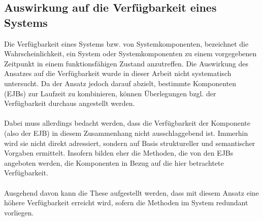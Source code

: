 \subsection{Auswirkung auf die Verfügbarkeit eines Systems}\label{sec_stabliliy}
Die Verfügbarkeit eines Systems bzw. von Systemkomponenten, bezeichnet die Wahrscheinlichkeit, ein System oder Systemkomponenten zu einem vorgegebenen Zeitpunkt in einem funktionsfähigen Zustand anzutreffen. \cite{it-admin}
Die Auswirkung des Ansatzes auf die Verfügbarkeit wurde in dieser Arbeit nicht systematisch untersucht. Da der Ansatz jedoch darauf abzielt, bestimmte Komponenten (EJBs) zur Laufzeit zu kombinieren, können Überlegungen bzgl. der Verfügbarkeit durchaus angestellt werden.
\\\\
Dabei muss allerdings bedacht werden, dass die Verfügbarkeit der Komponente (also der EJB) in diesem Zusammenhang nicht ausschlaggebend ist. Immerhin wird sie nicht direkt adressiert, sondern auf Basis struktureller und semantischer Vorgaben ermittelt. Insofern bilden eher die Methoden, die von den EJBs angeboten werden, die Komponenten in Bezug auf die hier betrachtete Verfügbarkeit.
\\\\
Ausgehend davon kann die These aufgestellt werden, dass mit diesem Ansatz eine höhere Verfügbarkeit erreicht wird, sofern die Methoden im System redundant vorliegen.
